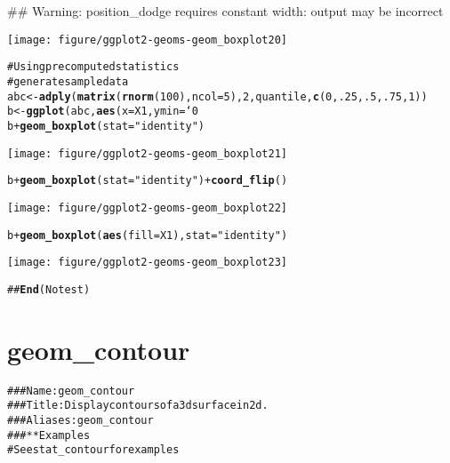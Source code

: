 \documentclass[a4paper,titlepage]{tufte-handout}\usepackage{graphicx, color}
\makeatletter
\def\maxwidth{ %
  \ifdim\Gin@nat@width>\linewidth
    \linewidth
  \else
    \Gin@nat@width
  \fi
}
\newcommand{\hlfunctioncall}[1]{\textcolor[rgb]{0.501960784313725,0,0.329411764705882}{\textbf{#1}}}%
\newcommand{\hlstring}[1]{\textcolor[rgb]{0.6,0.6,1}{#1}}%
\newcommand{\hlcomment}[1]{\textcolor[rgb]{0.180392156862745,0.6,0.341176470588235}{#1}}%
\newenvironment{kframe}{%
 \def\at@end@of@kframe{}%
 \ifinner\ifhmode%
  \def\at@end@of@kframe{\end{minipage}}%
  \begin{minipage}{\columnwidth}%
 \fi\fi%
 \def\FrameCommand##1{\hskip\@totalleftmargin \hskip-\fboxsep
 \colorbox{shadecolor}{##1}\hskip-\fboxsep
     \hskip-\linewidth \hskip-\@totalleftmargin \hskip\columnwidth}%
 \MakeFramed {\advance\hsize-\width
   \@totalleftmargin\z@ \linewidth\hsize
   \@setminipage}}%
 {\par\unskip\endMakeFramed%
 \at@end@of@kframe}
\newenvironment{knitrout}{}{} %
\makeatother
\begin{document}
\begin{knitrout}
\begin{kframe}
{\ttfamily\noindent\textcolor{warningcolor}{\#\# Warning: position\_dodge requires constant width: output may be incorrect}}\end{kframe}\texttt{[image: figure/ggplot2-geoms-geom\_boxplot20]} \begin{kframe}\begin{alltt}
\hlcomment{# Using precomputed statistics}
\hlcomment{# generate sample data}
abc <- \hlfunctioncall{adply}(\hlfunctioncall{matrix}(\hlfunctioncall{rnorm}(100), ncol = 5), 2, quantile, \hlfunctioncall{c}(0, .25, .5, .75, 1))
b <- \hlfunctioncall{ggplot}(abc, \hlfunctioncall{aes}(x = X1, ymin = `0%`, lower = `25%`, middle = `50%`, upper = `75%`, ymax = `100%`))
b + \hlfunctioncall{geom_boxplot}(stat = \hlstring{"identity"})
\end{alltt}
\end{kframe}\texttt{[image: figure/ggplot2-geoms-geom\_boxplot21]} \begin{kframe}\begin{alltt}
b + \hlfunctioncall{geom_boxplot}(stat = \hlstring{"identity"}) + \hlfunctioncall{coord_flip}()
\end{alltt}
\end{kframe}\texttt{[image: figure/ggplot2-geoms-geom\_boxplot22]} \begin{kframe}\begin{alltt}
b + \hlfunctioncall{geom_boxplot}(\hlfunctioncall{aes}(fill = X1), stat = \hlstring{"identity"})
\end{alltt}
\end{kframe}\texttt{[image: figure/ggplot2-geoms-geom\_boxplot23]} \begin{kframe}\begin{alltt}
\hlcomment{## \hlfunctioncall{End}(No test)}
\end{alltt}
\end{kframe}
\end{knitrout}


\section{geom\_contour}

\begin{knitrout}
\color{fgcolor}\begin{kframe}
\begin{alltt}
\hlcomment{### Name: geom_contour}
\hlcomment{### Title: Display contours of a 3d surface in 2d.}
\hlcomment{### Aliases: geom_contour}
\hlcomment{### ** Examples}
\hlcomment{# See stat_contour for examples}
\end{alltt}
\end{kframe}
\end{knitrout}
\end{document}
